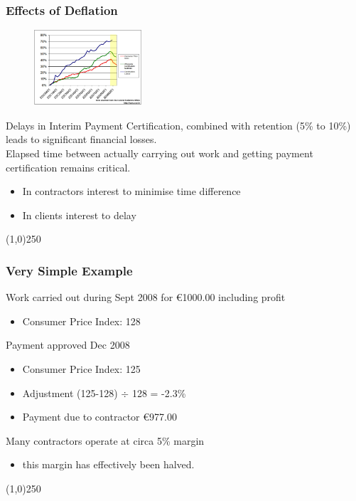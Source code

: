 \begin{frame}
\frametitle{Effects of Deflation}
\begin{figure}
	\centering
		\includegraphics[width = 4cm]{images/deflation2.jpg}
	\label{fig:deflation2b}
\end{figure}
Delays in Interim Payment Certification, combined with retention (5\% to 10\%) leads to significant financial losses.\\
Elapsed time between actually carrying out work and getting payment certification remains critical.\\
\begin{itemize}
	\item In contractors interest to minimise time difference
	\item In clients interest to delay
\end{itemize}
\end{frame}
\begin{center}\line(1,0){250}\end{center}






\begin{frame}
\frametitle{Very Simple Example}
Work carried out during Sept 2008 for  \euro1000.00 including profit
\begin{itemize}
	\item Consumer Price Index: 128
\end{itemize}
Payment approved Dec 2008
\begin{itemize}
	\item Consumer Price Index: 125
	\item Adjustment (125-128) $\div$ 128 = -2.3\%
	\item Payment due to contractor \euro977.00
\end{itemize}
Many contractors operate at circa 5\% margin
\begin{itemize}
	\item this margin has effectively been halved.
\end{itemize}
\end{frame}
\begin{center}\line(1,0){250}\end{center}






